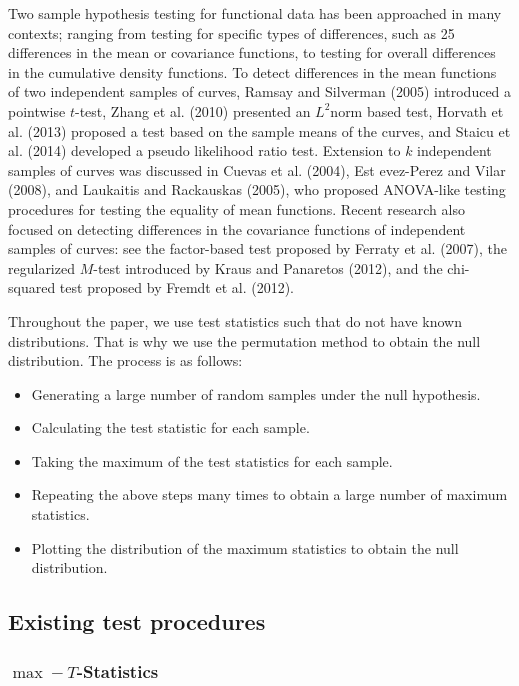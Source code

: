 \documentclass[12pt]{article}
\begin{document}
Two sample hypothesis testing for functional data has been approached in many contexts;
ranging from testing for specific types of differences, such as 25 differences in the
mean or covariance functions, to testing for overall differences in the cumulative
density functions. To detect differences in the mean functions of two independent
samples of curves, Ramsay and Silverman (2005) introduced a pointwise $t$-test,
Zhang et al. (2010) presented an $L^2$norm based test, Horvath et al. (2013)
proposed a test based on the sample means of the curves, and Staicu et al. (2014)
developed a pseudo likelihood ratio test. Extension to $k$ independent samples of
curves was discussed in Cuevas et al. (2004), Est evez-Perez and Vilar (2008),
and Laukaitis and Rackauskas (2005), who proposed ANOVA-like testing procedures
for testing the equality of mean functions. Recent research also focused on
detecting differences in the covariance functions of independent samples of
curves: see the factor-based test proposed by Ferraty et al. (2007), the
regularized $M$-test introduced by Kraus and Panaretos (2012), and the chi-squared
test proposed by Fremdt et al. (2012).

Throughout the paper, we use test statistics such that do not have
known distributions. That is why we use the permutation method to obtain
the null distribution. The process is as follows:

\begin{itemize}
\item Generating a large number of random samples under the null hypothesis.
\item Calculating the test statistic for each sample.
\item Taking the maximum of the test statistics for each sample.
\item Repeating the above steps many times to obtain a large number of maximum statistics.
\item Plotting the distribution of the maximum statistics to obtain the null distribution.
\end{itemize}


\subsection{Existing test procedures}

\subsubsection{$\max-T$-Statistics}
\end{document}
